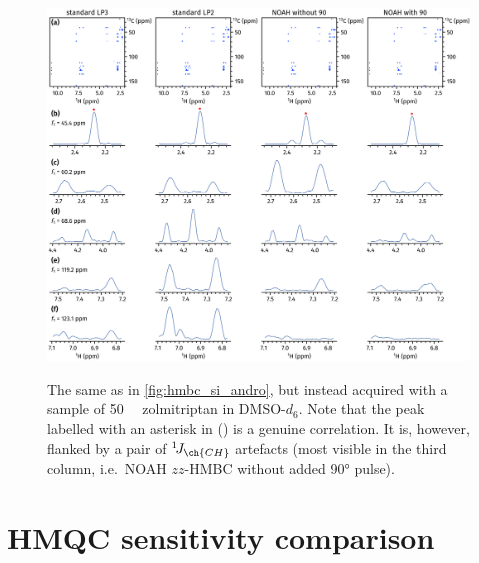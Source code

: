 \documentclass[a4paper,11pt]{article}
\newcommand{\onejch}{{}^1\!J_{\ch{CH}}}
\begin{document}
\begin{refsection}
\begin{figure}[H]
    \centering
    \includegraphics[width=\textwidth]{hmbc_si_zolmi.png}
    {\label{fig:hmbc_si_zolmi_overall}}
    {\label{fig:hmbc_si_zolmi_trace1}}
    {\label{fig:hmbc_si_zolmi_trace2}}
    {\label{fig:hmbc_si_zolmi_trace3}}
    {\label{fig:hmbc_si_zolmi_trace4}}
    {\label{fig:hmbc_si_zolmi_trace5}}
    \caption{
        The same as in \cref{fig:hmbc_si_andro}, but instead acquired with a sample of \SI{50}{\milli\molar} zolmitriptan in DMSO-\(d_6\).
        Note that the peak labelled with an asterisk in () is a genuine correlation.
        It is, however, flanked by a pair of \(\onejch{}\) artefacts (most visible in the third column, i.e.\ NOAH \(zz\)-HMBC without added \ang{90} pulse).
    }
    \label{fig:hmbc_si_zolmi}
\end{figure}

\section{HMQC sensitivity comparison}
\label{sec:si_hmqc_comp_snr}


\end{refsection}
\end{document}
